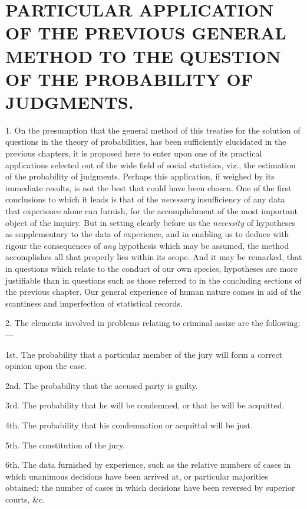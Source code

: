 \documentclass[oneside]{book}
\begin{document}




\chapter[PROBABILITY OF JUDGEMENTS]{\large PARTICULAR APPLICATION OF THE PREVIOUS GENERAL METHOD
TO THE QUESTION OF THE PROBABILITY OF JUDGMENTS.}

1. On the presumption that the general method of this treatise
for the solution of questions in the theory of probabilities,
has been sufficiently elucidated in the previous chapters, it is proposed here to enter upon one of its practical applications selected
out of the wide field of social statistics, viz., the estimation of the
probability of judgments. Perhaps this application, if weighed
by its immediate results, is not the best that could have been
chosen. One of the first conclusions to which it leads is that of
the \emph{necessary} insufficiency of any data that experience alone can
furnish, for the accomplishment of the most important object of
the inquiry. But in setting clearly before us the \emph{necessity} of
hypotheses as supplementary to the data of experience, and in
enabling us to deduce with rigour the consequences of \emph{any} hypothesis which may be assumed, the method accomplishes all
that properly lies within its scope. And it may be remarked,
that in questions which relate to the conduct of our own species,
hypotheses are more justifiable than in questions such as those referred to in the concluding sections of the previous chapter. Our
general experience of human nature comes in aid of the scantiness
and imperfection of statistical records.

2. The elements involved in problems relating to criminal
assize are the following:---

1st. The probability that a particular member of the jury
will form a correct opinion upon the case.

2nd. The probability that the accused party is guilty.

3rd. The probability that he will be condemned, or that he
will be acquitted.

4th. The probability that his condemnation or acquittal will
be just.

5th. The constitution of the jury.

6th. The data furnished by experience, such as the relative
numbers of cases in which unanimous decisions have been arrived
at, or particular majorities obtained; the number of cases in
which decisions have been reversed by superior courts, \&c.
\end{document}
